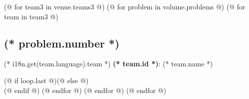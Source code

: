 \documentclass[12pt, twoside]{article}
\newcounter{volume}
\newcounter{problem}
\newcounter{team}
\begin{document}
    \pagestyle{tearoff}    
    (@ for team3 in venue.teams3 @)
        (@ for problem in volume.problems @)
            (@ for team in team3 @)
                \setcounter{volume}{(* volume.number *)}%
                \setcounter{problem}{(* problem.number *)}%
                \setcounter{team}{(* team.id *)}%
                \begin{minipage}[t][90mm][t]{\textwidth}%
                    \begin{minipage}[t][82mm][t]{0.875\linewidth}\vspace{0pt}%
                        \subsection{(* problem.number *)}%
                        \setlength{\parskip}{6pt}
                    \end{minipage}%
                    \begin{minipage}[t][82mm][t]{0.125\linewidth}\vspace{0pt}%
                        \hspace{1mm}
                        \hspace{1mm}
                    \end{minipage}
                    {\small (* i18n.get(team.language).team *) \textbf{(* team.id *)}: (* team.name *)}
                \end{minipage}%
                (@ if loop.last @)\newpage(@ else @)\\(@ endif @)
            (@ endfor @)
        (@ endfor @)
    (@ endfor @)
\end{document}

